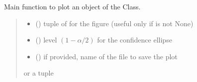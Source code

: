 \documentclass[letterpaper,10pt,english]{sphinxmanual}
\begin{document}
\begin{fulllineitems}
\begin{fulllineitems}
\label{\detokenize{cubmods:cubmods.cub.CUBresCUB00.plot}}
\pysigstartsignatures
{}
\pysigstopsignatures
\sphinxAtStartPar
Main function to plot an object of the Class.
\begin{quote}\begin{description}
\begin{itemize}
\item {} 
\sphinxAtStartPar
{} () \textendash{} tuple of  for the figure (useful only if  is not None)

\item {} 
\sphinxAtStartPar
{} () \textendash{} level \((1-\alpha/2)\) for the confidence ellipse

\item {} 
\sphinxAtStartPar
{} () \textendash{} if provided, name of the file to save the plot

\end{itemize}

\sphinxAtStartPar
{} or a tuple 

\end{description}\end{quote}

\end{fulllineitems}



\end{fulllineitems}
\end{document}
